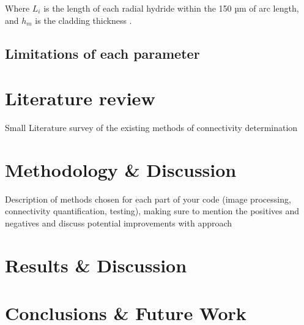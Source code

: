 \documentclass[12pt]{article}
\begin{document}
\vspace{150}
\noindent
Where $L_i$ is the length of each radial hydride within the 150 µm of arc length, and $h_m$ is the cladding thickness \cite{SIMON2021152817}.

\subsection{Limitations of each parameter}



\section{Literature review}

Small Literature survey of the existing methods of connectivity determination

\cite{COLAS2013586}
\cite{SHARMA2018546}
\cite{SUNIL2020152457}

\section{Methodology \& Discussion}

Description of methods chosen for each part of your code (image processing, connectivity quantification, testing), making sure to mention the positives and negatives and discuss potential improvements with approach

\section{Results \& Discussion}


\section{Conclusions \& Future Work}




\newpage
\singlespacing


\end{document}
